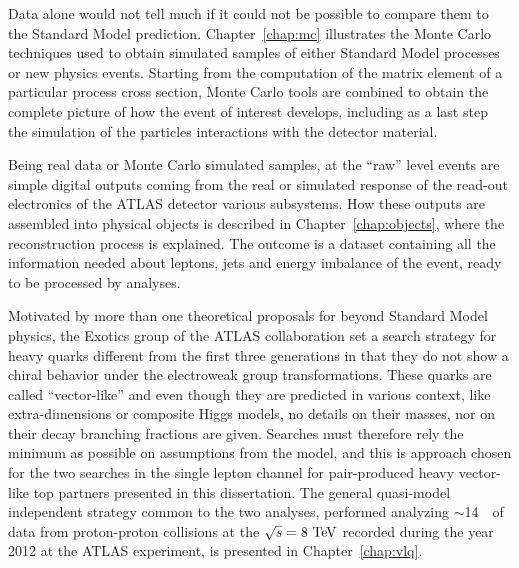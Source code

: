 Data alone would not tell much if it could not be possible to
compare them to the Standard Model prediction.
Chapter~\ref{chap:mc} illustrates the Monte Carlo techniques used
to obtain simulated samples of either Standard Model processes or
new physics events. 
Starting from the computation of the matrix element of a 
particular process cross section, Monte Carlo tools
are combined to obtain the complete picture of how the
event of interest develops, including as a last step
the simulation of the particles interactions with the
detector material.

Being real data or Monte Carlo simulated samples, at
the ``raw'' level events are simple digital outputs coming
from the real or simulated response of the read-out electronics
of the ATLAS detector various subsystems. How these outputs
are assembled into physical objects is described in Chapter~\ref{chap:objects},
where the reconstruction process is explained.
The outcome is a dataset containing all the information needed
about leptons, jets and energy imbalance of the event,
ready to be processed by analyses.


Motivated by more than one theoretical proposals for beyond Standard Model
physics, the Exotics group of the ATLAS collaboration set a search strategy 
for heavy quarks different from the first three generations in that they
do not show a chiral behavior under the electroweak group transformations.
These quarks are called ``vector-like'' and even though they are
predicted in various context, like extra-dimensions or composite Higgs
models, no details on their masses, nor on their decay branching fractions
are given. Searches must therefore rely the minimum as possible on 
assumptions from the model, and this is approach chosen for the
two searches in the single lepton channel
for pair-produced heavy vector-like top partners 
presented in this dissertation. The general quasi-model independent
strategy common to the two analyses, performed analyzing 
$\sim$14~\ifb\ of data from proton-proton collisions at the
 \cme $\rts=8\tev$ recorded during the year 2012 
at the ATLAS experiment, is presented in
Chapter~\ref{chap:vlq}.

